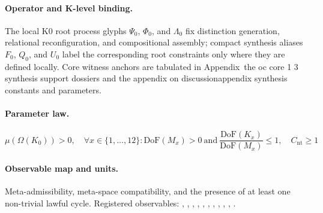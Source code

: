 \paragraph{Operator and K-level binding.}
The local K0 root process glyphs \(\Psi_0\), \(\Phi_0\), and \(\Lambda_0\) fix distinction generation, relational reconfiguration, and compositional assembly; compact synthesis aliases \(F_0\), \(Q_0\), and \(U_0\) label the corresponding root constraints only where they are defined locally.
Core witness anchors are tabulated in Appendix~the oc core 1 3 synthesis support dossiers and the appendix on discussionappendix synthesis constants and parameters.

\paragraph{Parameter law.}
\[
\mu(\Omega(K_0)) > 0,\quad \forall x \in \{1,\dots,12\}: \mathrm{DoF}(M_x)>0\ \mathrm{and}\ \frac{\mathrm{DoF}(K_x)}{\mathrm{DoF}(M_x)} \leq 1,\quad C_{\mathrm{nt}} \geq 1
\]

\paragraph{Observable map and units.}
Meta-admissibility, meta-space compatibility, and the presence of at least one non-trivial lawful cycle.
Registered observables: , \allowbreak {}, \allowbreak {}, \allowbreak {}, \allowbreak {}, \allowbreak {}, \allowbreak {}, \allowbreak {}, \allowbreak {}, \allowbreak {}, \allowbreak {}.

